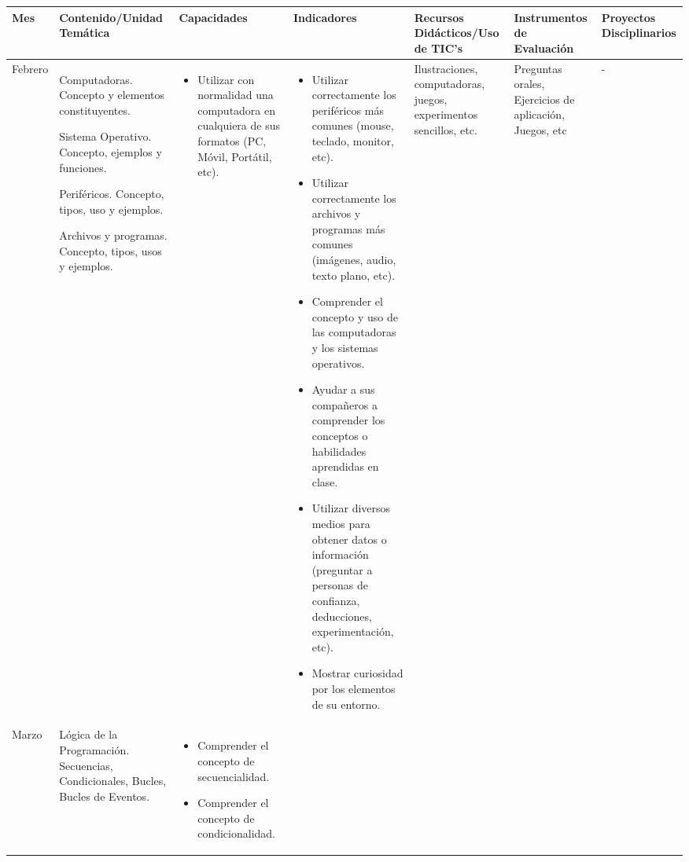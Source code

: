 \documentclass[landscape, a4paper, 10pt]{article}
\newcommand{\smallcellwidth}{0.7in}
\newcommand{\normalcellwidth}{1.2in}
\newcommand{\bigcellwidth}{2.0in}
\begin{document}
	\begin{longtable}{|m{\smallcellwidth}|p{\normalcellwidth}|p{\bigcellwidth}|p{\bigcellwidth}|p{\normalcellwidth}|p{\normalcellwidth}|p{\normalcellwidth}|}
		\hline
		\textbf{Mes} &
		\textbf{Contenido/Unidad Temática} &
		\textbf{Capacidades} &
		\textbf{Indicadores} &
		\textbf{Recursos Didácticos/Uso de TIC's} &
		\textbf{Instrumentos de Evaluación} &
		\textbf{Proyectos Disciplinarios} \\
		\hline
		\endhead
		Febrero &
		Computadoras. Concepto y elementos constituyentes.\par
		Sistema Operativo. Concepto, ejemplos y funciones.\par
		Periféricos. Concepto, tipos, uso y ejemplos.\par
		Archivos y programas. Concepto, tipos, usos y ejemplos. &
		\begin{itemize}
			\item Utilizar con normalidad una computadora en cualquiera de sus formatos (PC, Móvil, Portátil, etc).
		\end{itemize} &
		\begin{itemize}
			\item Utilizar correctamente los periféricos más comunes (mouse, teclado, monitor, etc).
			\item Utilizar correctamente los archivos y programas más comunes (imágenes, audio, texto plano, etc).
			\item Comprender el concepto y uso de las computadoras y los sistemas operativos.
			\item Ayudar a sus compañeros a comprender los conceptos o habilidades aprendidas en clase.
			\item Utilizar diversos medios para obtener datos o información (preguntar a personas de confianza, deducciones, experimentación, etc).
			\item Mostrar curiosidad por los elementos de su entorno.
		\end{itemize} &
		Ilustraciones, computadoras, juegos, experimentos sencillos, etc. &
		Preguntas orales, Ejercicios de aplicación, Juegos, etc &
		 - \\
		\hline
		Marzo &
		Lógica de la Programación. Secuencias, Condicionales, Bucles, Bucles de Eventos. &
		\begin{itemize}
			\item Comprender el concepto de secuencialidad.
			\item Comprender el concepto de condicionalidad.

\end{itemize}
\end{longtable}
\end{document}
